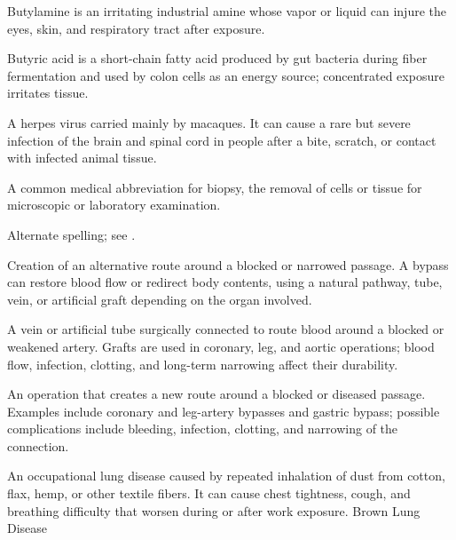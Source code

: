  Butylamine is an irritating industrial amine whose vapor or liquid can injure the eyes, skin, and respiratory tract after exposure.

 Butyric acid is a short-chain fatty acid produced by gut bacteria during fiber fermentation and used by colon cells as an energy source; concentrated exposure irritates tissue.

 A herpes virus carried mainly by macaques. It can cause a rare but severe infection of the brain and spinal cord in people after a bite, scratch, or contact with infected animal tissue.

 A common medical abbreviation for biopsy, the removal of cells or tissue for microscopic or laboratory examination.

 Alternate spelling; see .

 Creation of an alternative route around a blocked or narrowed passage. A bypass can restore blood flow or redirect body contents, using a natural pathway, tube, vein, or artificial graft depending on the organ involved.

 A vein or artificial tube surgically connected to route blood around a blocked or weakened artery. Grafts are used in coronary, leg, and aortic operations; blood flow, infection, clotting, and long-term narrowing affect their durability.

 An operation that creates a new route around a blocked or diseased passage. Examples include coronary and leg-artery bypasses and gastric bypass; possible complications include bleeding, infection, clotting, and narrowing of the connection.

 An occupational lung disease caused by repeated inhalation of dust from cotton, flax, hemp, or other textile fibers. It can cause chest tightness, cough, and breathing difficulty that worsen during or after work exposure.
\synonyms
Brown Lung Disease
